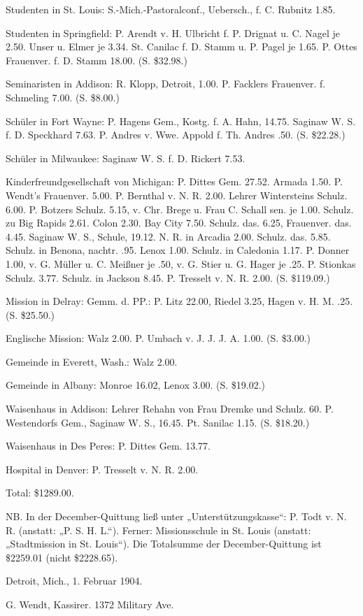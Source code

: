 Studenten in St. Louis: S.-Mich.-Pastoralconf., Uebersch., f. C. Rubnitz 1.85.

Studenten in Springfield: P. Arendt v. H. Ulbricht f. P. Drignat u. C. Nagel je 2.50. Unser u. Elmer je 3.34. St. Canilac f. D. Stamm u. P. Pagel je 1.65. P. Ottes Frauenver. f. D. Stamm 18.00. (S. \$32.98.)

Seminaristen in Addison: R. Klopp, Detroit, 1.00. P. Facklers Frauenver. f. Schmeling 7.00. (S. \$8.00.)

Schüler in Fort Wayne: P. Hagens Gem., Kostg. f. A. Hahn, 14.75. Saginaw W. S. f. D. Speckhard 7.63. P. Andres v. Wwe. Appold f. Th. Andres .50. (S. \$22.28.)


Schüler in Milwaukee: Saginaw W. S. f. D. Rickert 7.53.

Kinderfreundgesellschaft von Michigan: P. Dittes Gem. 27.52. Armada 1.50. P. Wendt’s Frauenver. 5.00. P. Bernthal v. N. R. 2.00. Lehrer Wintersteins Schulz. 6.00. P. Botzers Schulz. 5.15, v. Chr. Brege u. Frau C. Schall sen. je 1.00. Schulz. zu Big Rapids 2.61. Colon 2.30. Bay City 7.50. Schulz. das. 6.25, Frauenver. das. 4.45. Saginaw W. S., Schule, 19.12. N. R. in Arcadia 2.00. Schulz. das. 5.85. Schulz. in Benona, nachtr. .95. Lenox 1.00. Schulz. in Caledonia 1.17. P. Donner 1.00, v. G. Müller u. C. Meißner je .50, v. G. Stier u. G. Hager je .25. P. Stionkas Schulz. 3.77. Schulz. in Jackson 8.45. P. Tresselt v. N. R. 2.00. (S. \$119.09.)

Mission in Delray: Gemm. d. PP.: P. Litz 22.00, Riedel 3.25, Hagen v. H. M. .25. (S. \$25.50.)

Englische Mission: Walz 2.00. P. Umbach v. J. J. J. A. 1.00. (S. \$3.00.)

Gemeinde in Everett, Wash.: Walz 2.00.

Gemeinde in Albany: Monroe 16.02, Lenox 3.00. (S. \$19.02.)

Waisenhaus in Addison: Lehrer Rehahn von Frau Dremke und Schulz. 60. P. Westendorfs Gem., Saginaw W. S., 16.45. Pt. Sanilac 1.15. (S. \$18.20.)

Waisenhaus in Des Peres: P. Dittes Gem. 13.77.

Hospital in Denver: P. Tresselt v. N. R. 2.00.

Total: \$1289.00.

NB. In der December-Quittung ließ unter „Unterstützungskasse“: P. Todt v. N. R. (anstatt: „P. S. H. L.“). Ferner: Missionsschule in St. Louis (anstatt: „Stadtmission in St. Louis“). Die Totalsumme der December-Quittung ist \$2259.01 (nicht \$2228.65).

Detroit, Mich., 1. Februar 1904.

G. Wendt, Kassirer.
1372 Military Ave.
